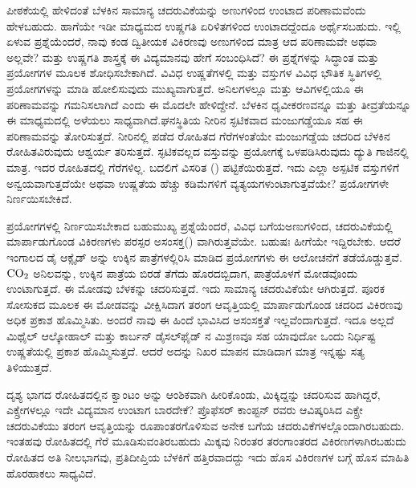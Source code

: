 ಪೀಠಕೆಯಲ್ಲಿ ಹೇಳಿದಂತೆ ಬೆಳಕಿನ ಸಾಮಾನ್ಯ ಚದರುವಿಕೆಯನ್ನು ಅಣುಗಳಿಂದ ಉಂಟಾದ ಪರಿಣಾಮವೆಂದು ಹೇಳಬಹುದು. ಹಾಗೆಯೇ ಇಡೀ ಮಾಧ್ಯಮದ ಉಷ್ಣಗತಿ ಏರಿಳಿತಗಳಿಂದ ಉಂಟಾದದ್ದೆಂದೂ ಅರ್ಥೈಸಬಹುದು. ಇಲ್ಲಿ ಏಳುವ ಪ್ರಶ್ನೆಯೆಂದರೆ, ನಾವು ಕಂಡ ದ್ವಿತೀಯಕ ವಿಕಿರಣವು ಅಣುಗಳಿಂದ ಮಾತ್ರ ಆದ ಪರಿಣಾಮವೇ ಅಥವಾ ಅಲ್ಲವೇ? ಮತ್ತು ಉಷ್ಣಗತಿ ಶಾಸ್ತ್ರಕ್ಕೆ ಈ ವಿದ್ಯಮಾನವು ಹೇಗೆ ಸಂಬಂಧಿಸಿದೆ? ಈ ಪ್ರಶ್ನೆಗಳನ್ನು ಸಿದ್ಧಾಂತ ಮತ್ತು ಪ್ರಯೋಗಗಳ ಮೂಲಕ ಶೋಧಿಸಬೇಕಾಗಿದೆ. ವಿವಿಧ ಉಷ್ಣತೆಗಳಲ್ಲಿ ಮತ್ತು ವಸ್ತುಗಳ ವಿವಿಧ ಭೌತಿಕ ಸ್ಥಿತಿಗಳಲ್ಲಿ ಪ್ರಯೋಗಗಳನ್ನು ಮಾಡಿ ಹೋಲಿಸುವುದು ಮುಖ್ಯವಾಗುತ್ತದೆ. ಅನಿಲಗಳಲ್ಲೂ ಮತ್ತು ಆವಿಗಳ\-ಲ್ಲಿಯೂ ಈ ಪರಿಣಾಮವನ್ನು ಗಮನಿಸಲಾಗಿದೆ ಎಂದು ಈ ಮೊದಲೇ ಹೇಳಿದ್ದೇನೆ. ಬೆಳಕಿನ ಧೃವೀಕರಣವನ್ನೂ ಮತ್ತು ತೀವ್ರತೆಯನ್ನೂ ಈ ಮಾಧ್ಯಮದಲ್ಲಿ ಅಳೆಯಲು ಸಾಧ್ಯವಾಗಿದೆ.\break ಘನಸ್ಥಿತಿಯ ನೀರಿನ ಸ್ಫಟಿಕವಾದ ಮಂಜುಗಡ್ಡೆಯೂ ಸಹ ಈ ಪರಿಣಾಮವನ್ನು ತೋರಿಸುತ್ತದೆ. ನೀರಿನಲ್ಲಿ ಪಡೆದ ರೋಹಿತದ ಗೆರೆಗಳಂತೆಯೇ ಮಂಜುಗಡ್ಡೆಯ ಚದರಿದ ಬೆಳಕಿನ ರೋಹಿತವಿರುವುದು ಆಶ್ವರ್ಯ ತರಿಸುತ್ತದೆ. ಸ್ಫಟಿಕವಲ್ಲದ ವಸ್ತುವನ್ನು ಪ್ರಯೋಗಕ್ಕೆ ಒಳಪಡಿಸಿರುವುದು ದ್ಯುತಿ ಗಾಜಿನಲ್ಲಿ ಮಾತ್ರ. ಇದರ ರೋಹಿತದಲ್ಲಿ ಗೆರೆಗಳಿಲ್ಲ. ಬದಲಿಗೆ ವಿಸರಿತ () ಪಟ್ಟಿಕೆಯಿರುತ್ತದೆ. ಇದು ಎಲ್ಲಾ ಅಸ್ಪಟಿಕ ವಸ್ತುಗಳಿಗೆ ಅನ್ವಯವಾಗುತ್ತದೆಯೇ ಅಥವಾ ಉಷ್ಣತೆಯ ಹೆಚ್ಚು ಕಡಿಮೆಗಳಿಗೆ ವ್ಯತ್ಯಯಗಳುಂಟಾಗುತ್ತವೆಯೇ? ಪ್ರಯೋಗಗಳೇ ನಿರ್ಣಯಿಸಬೇಕಿದೆ.



ಪ್ರಯೋಗಗಳಲ್ಲಿ ನಿರ್ಣಯಿಸಬೇಕಾದ ಬಹುಮುಖ್ಯ ಪ್ರಶ್ನೆಯೆಂದರೆ, ವಿವಿಧ ಬಗೆಯ\break ಅಣುಗಳಿಂದ, ಚದರುವಿಕೆಯಲ್ಲಿ ಮಾರ್ಪಾಡುಗೊಂಡ ವಿಕಿರಣಗಳು ಪರಸ್ಪರ ಅಸಂಸಕ್ತ\break () ವಾಗಿರುತ್ತವೆಯೇ. ಬಹುಷಃ ಹೀಗೆಯೇ ಇದ್ದಿರಬೇಕು. ಆದರೆ ಇಂಗಾಲದ ಡೈ ಆಕ್ಸೈಡ್ ಅನ್ನು ಉಕ್ಕಿನ ಪಾತ್ರೆಗಳಲ್ಲಿರಿಸಿ ಮಾಡಿದ ಪ್ರಯೋಗಗಳು ಈ ಆಲೋಚನೆಗೆ ತಡೆಯೊಡ್ಡುತ್ತವೆ. ${\rm CO}_2$ ಅನಿಲವನ್ನು, ಉಕ್ಕಿನ ಪಾತ್ರೆಯ ಬಿರಡೆ ತೆಗೆದು ಹೊರದಬ್ಬಿದಾಗ, ಪಾತ್ರೆಯೊಳಗೆ ಮೋಡ\-ವೊಂದು ಉಂಟಾಗುತ್ತದೆ. ಈ ಮೋಡವು ಬೆಳಕನ್ನು ಚದರಿಸುತ್ತದೆ. ಇದು ಸಾಮಾನ್ಯ ಚದರುವಿಕೆಯೇ ಆಗಿರುತ್ತದೆ. ಪೂರಕ ಸೋಸುಕದ ಮೂಲಕ ಈ ಮೋಡವನ್ನು ವೀಕ್ಷಿಸಿದಾಗ ತರಂಗ ಆವೃತ್ತಿಯಲ್ಲಿ ಮಾರ್ಪಾಡುಗೊಂಡ ಚದರಿದ ವಿಕಿರಣವು ಅಧಿಕ ಪ್ರಕಾಶ ಹೊಮ್ಮಿಸಿತು. ಅಂದರೆ ನಾವು ಈ ಹಿಂದೆ ಭಾವಿಸಿದ ಅಸಂಸಕ್ತತೆ ಇಲ್ಲವೆಂದಾಗುತ್ತದೆ. ಇದೂ ಅಲ್ಲದೆ ಮಿಥೈಲ್ ಆಲ್ಕೋಹಾಲ್ ಮತ್ತು ಕಾರ್ಬನ್ ಡೈಸಲ್‍ಫೈಡ್ ನ ಮಿಶ್ರಣವೂ ಸಹ ಯಾವುದೋ ಒಂದು ನಿರ್ಧಿಷ್ಟ ಉಷ್ಣತೆಯಲ್ಲಿ ಪ್ರಕಾಶ ಹೊಮ್ಮಿಸುತ್ತದೆ. ಆದರೆ ಅದನ್ನು ನಿಖರ ಮಾಪನ ಮಾಡಿದಾಗ ಮಾತ್ರ ಇನ್ನಷ್ಟು ಸತ್ಯ ತಿಳಿಯುತ್ತದೆ.



ದೃಶ್ಯ ಭಾಗದ ರೋಹಿತದಲ್ಲಿನ ಕ್ವಾಂಟಂ ಅನ್ನು ಆಂಶಿಕವಾಗಿ ಹೀರಿಕೊಂಡು, ಮಿಕ್ಕಿದ್ದನ್ನು ಚದರಿಸುವ ಹಾಗಿದ್ದರೆ, ಎಕ್ಸ್\enginline{-}ರೇಗಳಲ್ಲೂ ಇದೇ ವಿದ್ಯಮಾನ ಉಂಟಾಗ ಬಾರದೇಕೆ? ಪ್ರೊಫೆಸರ್ ಕಾಂಪ್ಟನ್ ರವರು ಆವಿಷ್ಕರಿಸಿದ ಎಕ್ಸ್\enginline{-}ರೇ ಚದರುವಿಕೆಯು ತರಂಗ ಆವೃತ್ತಿಯನ್ನು ರೂಪಾಂತರ\-ಗೊಳಿಸುವ ಅನೇಕ ಬಗೆಯ ಚದರುವಿಕೆಗಳಲ್ಲೊಂದಾಗಿರಬಹುದು. ಇಂತಹವು ರೋಹಿತದಲ್ಲಿ ಗೆರೆ ಮೂಡಿಸುವಂತಿರಬಹುದು ಮಿಕ್ಕವು ನಿರಂತರ ತರಂಗಾಂತರದ ವಿಕಿರಣಗಳಾಗಿರಬಹುದು ರೋಹಿತದ ಅತಿ ನೀಲಭಾಗವು, ಪ್ರತಿದೀಪ್ತಿಯ ಬೆಳಕಿಗೆ ಹತ್ತಿರವಾದದ್ದು ಇದು ಹೊಸ ವಿಕಿರಣಗಳ ಬಗ್ಗೆ ಹೊಸ ಮಾಹಿತಿ ಹೊರಹಾಕಲು ಸಾಧ್ಯವಿದೆ.


